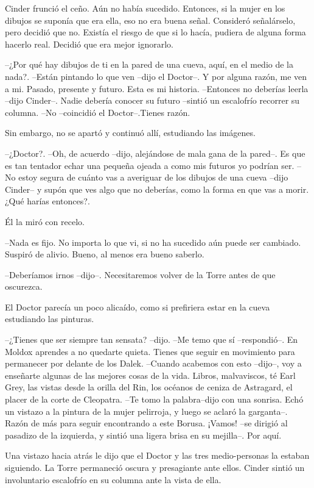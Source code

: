 Cinder frunció el ceño. Aún no había sucedido. Entonces, si la mujer en los dibujos se suponía que era ella, eso no era buena señal. Consideró señalárselo, pero decidió que no. Existía el riesgo de que si lo hacía, pudiera de alguna forma hacerlo real. Decidió que era mejor ignorarlo. 

--¿Por qué hay dibujos de ti en la pared de una cueva, aquí, en el medio de la nada?.
--Están pintando lo que ven --dijo el Doctor--. Y por alguna razón, me ven a mi. Pasado, presente y futuro. Esta es mi historia.
--Entonces no deberías leerla --dijo Cinder--. Nadie debería conocer su futuro --sintió un escalofrío recorrer su columna.
--No --coincidió el Doctor--.Tienes razón. 

Sin embargo, no se apartó y continuó allí, estudiando las imágenes.

--¿Doctor?.
--Oh, de acuerdo --dijo, alejándose de mala gana de la pared--. Es que es tan tentador echar una pequeña ojeada a como mis futuros yo podrían ser.
--No estoy segura de cuánto vas a averiguar de los dibujos de una cueva --dijo Cinder-- y supón que ves algo que no deberías, como la forma en que vas a morir. ¿Qué harías entonces?.

Él la miró con recelo. 

--Nada es fijo. No importa lo que vi, si no ha sucedido aún puede ser cambiado.
Suspiró de alivio. Bueno, al menos era bueno saberlo. 

--Deberíamos irnos --dijo--. Necesitaremos volver de la Torre antes de que oscurezca.

El Doctor parecía un poco alicaído, como si prefiriera estar en la cueva estudiando las pinturas. 

--¿Tienes que ser siempre tan sensata? --dijo.
--Me temo que sí --respondió--. En Moldox aprendes a no quedarte quieta. Tienes que seguir en movimiento para permanecer por delante de los Dalek.
--Cuando acabemos con esto --dijo--, voy a enseñarte algunas de las mejores cosas de la vida. Libros, malvaviscos, té Earl Grey, las vistas desde la orilla del Rin, los océanos de ceniza de Astragard, el placer de la corte de Cleopatra.
--Te tomo la palabra--dijo con una sonrisa. Echó un vistazo a la pintura de la mujer pelirroja, y luego se aclaró la garganta--. Razón de más para seguir encontrando a este Borusa. ¡Vamos! --se dirigió al pasadizo de la izquierda, y sintió una ligera brisa en su mejilla--. Por aquí.

Una vistazo hacia atrás le dijo que el Doctor y las tres medio-personas la estaban siguiendo.
La Torre permaneció oscura y presagiante ante ellos. Cinder sintió un involuntario escalofrío en su columna ante la vista de ella. 

